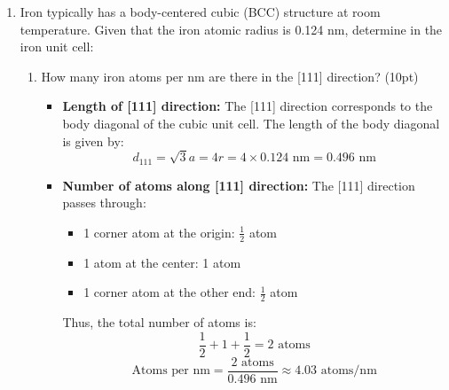 \documentclass[10pt]{article}
\begin{document}
\begin{enumerate}[leftmargin=0.7cm, label=\textbf{\arabic*.}, itemsep=1em]
\begin{center}
       \captionsetup{type=figure}
       \end{center}
	
	\item Iron typically has a body-centered cubic (BCC) structure at room temperature. Given that the iron atomic radius is 0.124 nm, determine in the iron unit cell:
    \begin{enumerate}[label=\textbf{\alph*.}, leftmargin=0.7cm, itemsep=0.5em]
        \item How many iron atoms per nm are there in the [111] direction? (10pt)
        \begin{itemize}[leftmargin=0.5cm]
            \item \textbf{Length of [111] direction:} The [111] direction corresponds to the body diagonal of the cubic unit cell. The length of the body diagonal is given by:
            \[
            d_{111} = \sqrt{3}a = 4r = 4 \times 0.124 \text{ nm} = 0.496 \text{ nm}
            \]

            \item \textbf{Number of atoms along [111] direction:} 
            The [111] direction passes through:
            \begin{itemize}
                \item 1 corner atom at the origin: \(\frac{1}{2}\) atom
                \item 1 atom at the center: 1 atom
                \item 1 corner atom at the other end: \(\frac{1}{2}\) atom
            \end{itemize}
            Thus, the total number of atoms is:
            \[
            \frac{1}{2} + 1 + \frac{1}{2} = 2 \text{ atoms}
            \]
            \[
            \text{Atoms per nm} = \frac{2 \text{ atoms}}{0.496 \text{ nm}} \approx 4.03 \text{ atoms/nm}
            \]
        \end{itemize}


\end{enumerate}
\end{enumerate}
\end{document}
